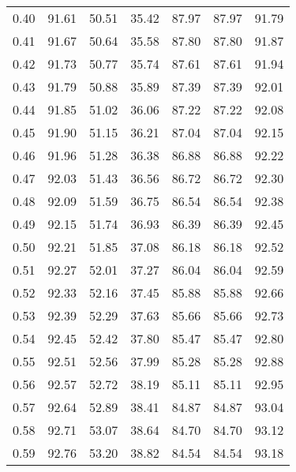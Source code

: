 \begin{tabular}{|c|c|c|c|c|c|c|}
      0.40 &     91.61 &     50.51 &      35.42 &   87.97 &      87.97 &         91.79 \\
      0.41 &     91.67 &     50.64 &      35.58 &   87.80 &      87.80 &         91.87 \\
      0.42 &     91.73 &     50.77 &      35.74 &   87.61 &      87.61 &         91.94 \\
      0.43 &     91.79 &     50.88 &      35.89 &   87.39 &      87.39 &         92.01 \\
      0.44 &     91.85 &     51.02 &      36.06 &   87.22 &      87.22 &         92.08 \\
      0.45 &     91.90 &     51.15 &      36.21 &   87.04 &      87.04 &         92.15 \\
      0.46 &     91.96 &     51.28 &      36.38 &   86.88 &      86.88 &         92.22 \\
      0.47 &     92.03 &     51.43 &      36.56 &   86.72 &      86.72 &         92.30 \\
      0.48 &     92.09 &     51.59 &      36.75 &   86.54 &      86.54 &         92.38 \\
      0.49 &     92.15 &     51.74 &      36.93 &   86.39 &      86.39 &         92.45 \\
      0.50 &     92.21 &     51.85 &      37.08 &   86.18 &      86.18 &         92.52 \\
      0.51 &     92.27 &     52.01 &      37.27 &   86.04 &      86.04 &         92.59 \\
      0.52 &     92.33 &     52.16 &      37.45 &   85.88 &      85.88 &         92.66 \\
      0.53 &     92.39 &     52.29 &      37.63 &   85.66 &      85.66 &         92.73 \\
      0.54 &     92.45 &     52.42 &      37.80 &   85.47 &      85.47 &         92.80 \\
      0.55 &     92.51 &     52.56 &      37.99 &   85.28 &      85.28 &         92.88 \\
      0.56 &     92.57 &     52.72 &      38.19 &   85.11 &      85.11 &         92.95 \\
      0.57 &     92.64 &     52.89 &      38.41 &   84.87 &      84.87 &         93.04 \\
      0.58 &     92.71 &     53.07 &      38.64 &   84.70 &      84.70 &         93.12 \\
      0.59 &     92.76 &     53.20 &      38.82 &   84.54 &      84.54 &         93.18 \\

\end{tabular}
